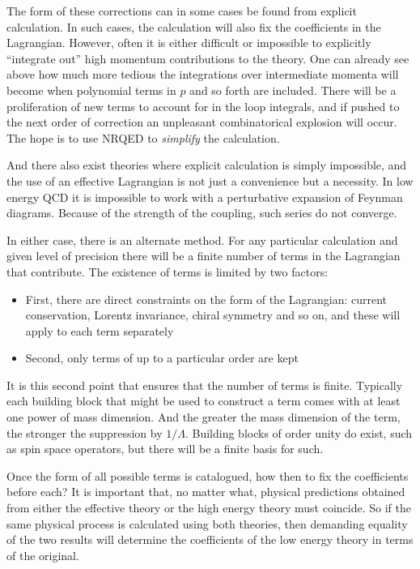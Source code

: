 The form of these corrections can in some cases be found from explicit calculation.  In such cases, the calculation will also fix the coefficients in the Lagrangian.  However, often it is either difficult or impossible to explicitly ``integrate out'' high momentum contributions to the theory.  One can already see above how much more tedious the integrations over intermediate momenta will become when polynomial terms in $p$ and so forth are included.  There will be a proliferation of new terms to account for in the loop integrals, and if pushed to the next order of correction an unpleasant combinatorical explosion will occur.  The hope is to use NRQED to \emph{simplify} the calculation.

And there also exist theories where explicit calculation is simply impossible, and the use of an effective Lagrangian is not just a convenience but a necessity.  In low energy QCD it is impossible to work with a perturbative expansion of Feynman diagrams.  Because of the strength of the coupling, such series do not converge.

In either case, there is an alternate method.  For any particular calculation and given level of precision there will be a finite number of terms in the Lagrangian that contribute.  The existence of terms is limited by two factors:
\begin{itemize}
  \item First, there are direct constraints on the form of the Lagrangian:  current conservation, Lorentz invariance, chiral symmetry and so on, and these will apply to each term separately
  \item Second, only terms of up to a particular order are kept
\end{itemize}
It is this second point that ensures that the number of terms is finite.  Typically each building block that might be used to construct a term comes with at least one power of mass dimension.  And the greater the mass dimension of the term, the stronger the suppression by $1/\Lambda$.  Building blocks of order unity do exist, such as spin space operators, but there will be a finite basis for such.

Once the form of all possible terms is catalogued, how then to fix the coefficients before each?  It is important that, no matter what, physical predictions obtained from either the effective theory or the high energy theory must coincide.  So if the same physical process is calculated using both theories, then demanding equality of the two results will determine the coefficients of the low energy theory in terms of the original.

